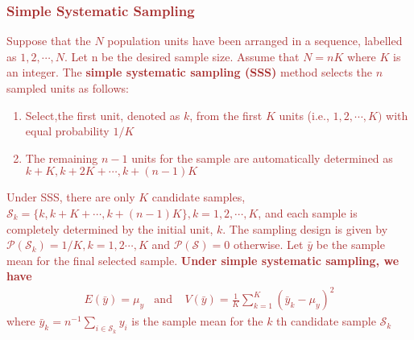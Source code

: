 \documentclass[a4paper,twoside,11pt]{article}
\begin{document}
\begin{center}
\end{center}
\textcolor{Brown}{
\subsubsection{Simple Systematic Sampling}
Suppose that the $N$ population units have been arranged in a sequence, labelled as $1,2,\cdots,N$. Let n be the desired sample size. Assume that $N = nK$ where $K$ is an integer. The \textbf{simple systematic sampling (SSS)} method selects the $n$ sampled units as follows:
\begin{enumerate}
    \item Select,the first unit, denoted as $k$, from the first $K$ units (i.e., $1,2,\cdots, K)$ with equal probability $1/K$
    \item The remaining $n-1$ units for the sample are automatically determined as $k+K, k+2K + \cdots , k+(n-1)K$
\end{enumerate}
Under SSS, there are only $K$ candidate samples, $\mathcal{S}_k = \{ k,k+K + \cdots, k+(n-1)K \}, k=1,2,\cdots, K$, and each sample is completely determined by the initial unit, $k$. The sampling design is given by $\mathcal{P}(\mathcal{S}_k)=1/K, k=1,2\cdots,K$ and $\mathcal{P}(\mathcal{S})=0$ otherwise. Let $\bar{y}$ be the sample mean for the final selected sample. 
\newline
\newline
\textbf{Under simple systematic sampling, we have }
\begin{equation*}
\begin{aligned}
E(\bar{y}) = \mu_y \ \ \ \ \text{and} \ \ \ \ \ V(\bar{y}) = \frac{1}{K} \sum^K_{k=1} (\bar{y}_k - \mu_y)^2
\end{aligned}
\end{equation*}
where $\bar{y}_k = n^{-1} \sum_{i \in \mathcal{S}_k} y_i$ is the sample mean for the $k$ th candidate sample $\mathcal{S}_k$}
\end{document}
